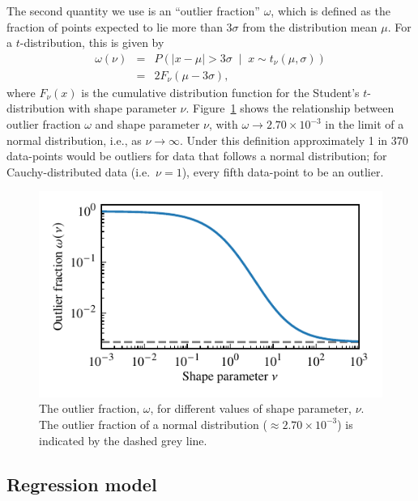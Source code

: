 \documentclass[fleqn,usenatbib]{rasti}
\newcommand{\studentt}[2]{t_\nu \left( #1, #2 \right)}
\begin{document}
The second quantity we use is an ``outlier fraction'' $\omega$, which is defined
as the fraction of points expected to lie more than $3\sigma$ from the
distribution mean $\mu$. For a $t$-distribution, this is given by
\begin{eqnarray}
    \omega(\nu)
    &=& P\left(
        \left|x - \mu \right| > 3 \sigma \;
        \middle| \;
        x \sim \studentt{\mu}{\sigma}
    \right) \label{eqn:model.outlier_frac}\\
    &=& 2 F_\nu \left(\mu - 3 \sigma \right),
\end{eqnarray}
where $F_\nu(x)$ is the cumulative distribution function for the Student's
$t$-distribution with shape parameter $\nu$. Figure~\ref{fig:model.outlier_frac}
shows the relationship between outlier fraction $\omega$ and shape parameter
$\nu$, with $\omega \rightarrow 2.70 \times 10^{-3} $ in the limit of a normal
distribution, i.e., as $\nu \rightarrow \infty$.  Under this definition
approximately 1 in 370 data-points would be outliers for data that follows a
normal distribution; for Cauchy-distributed data (i.e.\ $\nu = 1$), every fifth
data-point to be an outlier.

\begin{figure}
	\includegraphics{graphics/outlier_frac.pdf}
    \caption{The outlier fraction, $\omega$, for different values of shape
    parameter, $\nu$. The outlier fraction of a normal distribution ($\approx
    2.70 \times 10^{-3}$) is indicated by the dashed grey line.}
    \label{fig:model.outlier_frac}
\end{figure}

\subsection{Regression model}
\label{sec:formalism.model}
\end{document}
